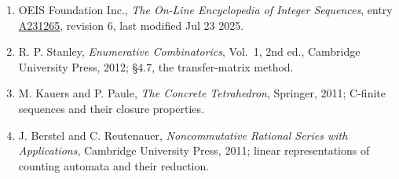\documentclass[11pt]{article}
\theoremstyle{definition}
\begin{document}
\begin{enumerate}

\item OEIS Foundation Inc., \emph{The On-Line Encyclopedia of Integer Sequences}, entry \href{https://oeis.org/A231265}{A231265}, revision 6, last modified Jul 23 2025.

\item R. P. Stanley, \emph{Enumerative Combinatorics}, Vol.~1, 2nd ed., Cambridge University Press, 2012; \S4.7, the transfer-matrix method.

\item M. Kauers and P. Paule, \emph{The Concrete Tetrahedron}, Springer, 2011; C-finite sequences and their closure properties.

\item J. Berstel and C. Reutenauer, \emph{Noncommutative Rational Series with Applications}, Cambridge University Press, 2011; linear representations of counting automata and their reduction.

\end{enumerate}
\end{document}
